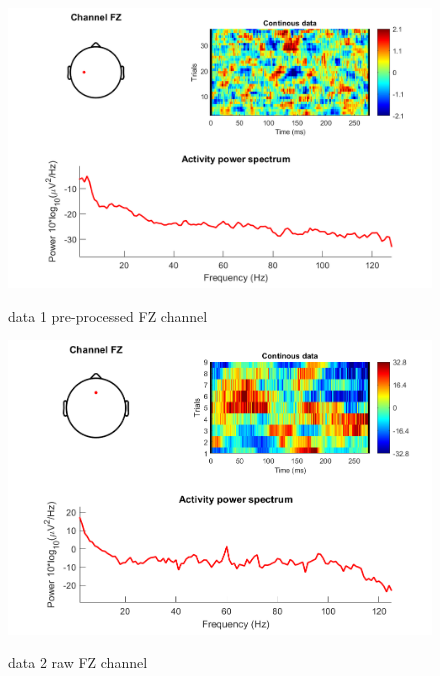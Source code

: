 \documentclass[11pt]{article}
\begin{document}
\begin{figure}[H]
    \begin{center}
        \includegraphics[scale=0.7]{Fig/Fz_spectra_preprocessed_data1.png}
        \label{fig:fzPre1}
        \caption{data 1 pre-processed FZ channel}
    \end{center}
\end{figure}

\begin{figure}[H]
    \begin{center}
        \includegraphics[scale=0.7]{Fig/Fz_spectra_raw_data2.png}
        \label{fig:fzRaw2}
        \caption{data 2 raw FZ channel}
    \end{center}
\end{figure}
\end{document}
